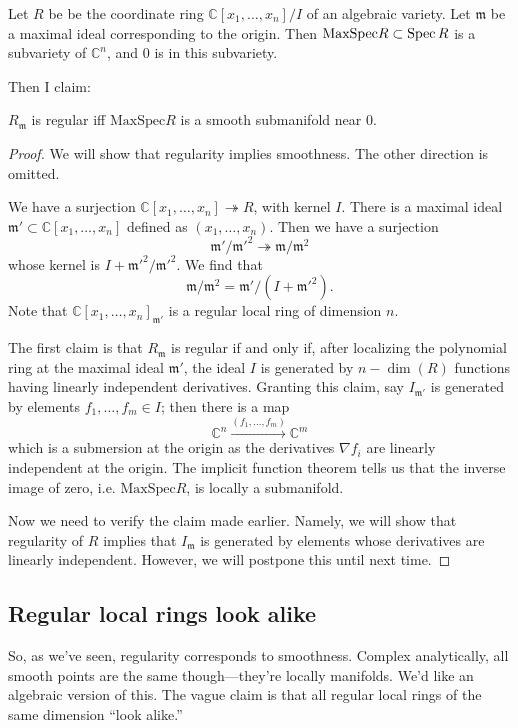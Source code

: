 \newcommand{\maxspec}{\mathrm{MaxSpec}}
\begin{example} 
Let $R$ be  be the coordinate ring $ \mathbb{C}[x_1, \dots, x_n]/I$ of an algebraic
variety. Let $\mathfrak{m}$ be  a maximal ideal corresponding to the origin.
Then $\maxspec R \subset \spec R$ is a subvariety of $\mathbb{C}^n$, and $0$ is in this subvariety.

Then I claim:

\begin{proposition} 
$R_{\mathfrak{m}}$ is regular iff $\maxspec R$ is a smooth submanifold near $0$.
\end{proposition}
\begin{proof} 
We will show that regularity implies smoothness. The other direction is omitted.

We have a surjection $\mathbb{C}[x_1, \dots, x_n ] \twoheadrightarrow R$, with
kernel $I$. There is a maximal ideal $\mathfrak{m}' \subset \mathbb{C}[x_1,
\dots, x_n]$ defined as $(x_1, \dots, x_n)$. Then we have a surjection
\[ \mathfrak{m}'/\mathfrak{m}'^2 \twoheadrightarrow \mathfrak{m}/\mathfrak{m}^2  \]
whose kernel is $I + \mathfrak{m}'^2/\mathfrak{m}'^2 $. We find that
\[ \mathfrak{m}/\mathfrak{m}^2 = \mathfrak{m}'/(I + \mathfrak{m}'^2).  \]
Note that $\mathbb{C}[x_1, \dots, x_n]_{\mathfrak{m}'}$ is a regular local
ring of dimension $n$.

The first claim is that $R_{\mathfrak{m}}$ is regular if and only if, after
localizing the polynomial ring at the maximal ideal $\mathfrak{m}'$, the ideal
$I$ is generated by $n - \dim(R)$ functions having linearly independent
derivatives.	Granting this claim, say $I_{\mathfrak{m}'}$ is generated by
elements $f_1, \dots, f_m \in I$; then there is a map
\[ \mathbb{C}^n \stackrel{(f_1, \dots, f_m)}{\to} \mathbb{C}^m  \]
which is a submersion at the origin as the derivatives $\nabla f_i$ are
linearly independent at the origin. The implicit function theorem tells us that
the inverse image of zero, i.e. $\maxspec R$, is locally a submanifold. 

Now we need to verify the claim made earlier. Namely, we will show that
regularity of $R$ implies that $I_{\mathfrak{m}}$ is generated by elements
whose derivatives are linearly independent. However, we will postpone this
until next time.
\end{proof} 
\end{example} 


\subsection{Regular local rings look alike}
So, as we've seen, regularity corresponds to smoothness. Complex analytically,
all smooth points are the same though---they're locally manifolds.  We'd like
an algebraic version of this. The vague
claim is that all regular local rings of the same dimension ``look alike.''


